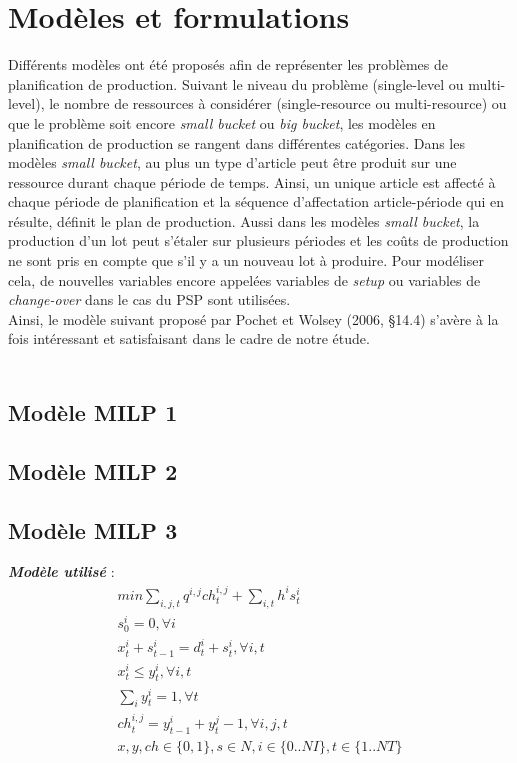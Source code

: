 \documentclass[12pt,a4paper]{article}
\begin{document}
		\section{Modèles et formulations}
		Différents modèles ont été proposés afin de représenter les problèmes de planification de production. Suivant le niveau du problème (single-level ou multi-level), le nombre de ressources à considérer (single-resource ou multi-resource) ou que le problème soit encore \emph{small bucket} ou \emph{big bucket}, les modèles en planification de production se rangent dans différentes catégories.   Dans les modèles \emph{small bucket}, au plus un type d'article  peut être produit sur une ressource durant chaque période de temps. Ainsi, un unique article est affecté à chaque période de planification et la séquence d'affectation article-période qui en résulte, définit le plan de production. Aussi dans les modèles \emph{small bucket}, la production d'un lot peut s'étaler sur plusieurs périodes et les coûts de production ne sont pris en compte que s'il y a un nouveau lot à produire. Pour modéliser cela, de nouvelles variables encore appelées variables de \emph{setup} ou variables de \emph{change-over} dans le cas du PSP sont utilisées. \\
		\hspace*{.5cm} Ainsi, le modèle suivant proposé par Pochet et Wolsey (2006, §14.4) s'avère à la fois intéressant et satisfaisant dans le cadre de notre étude.\\
		\\
		\subsection{Modèle MILP 1}
		\subsection{Modèle MILP 2}
		\subsection{Modèle MILP 3}
		\textbf{\textsl{Modèle utilisé}} :
		\begin{eqnarray}
			min \sum_{i,j,t} q^{i,j}ch_{t}^{i,j} + \sum_{i,t} h^{i} s_{t}^{i} \\
			s_{0}^{i} = 0, \forall i \\
			x_{t}^{i} + s_{t-1}^{i} = d_{t}^{i} + s_{t}^{i}, \forall i,t \\
			x_{t}^{i} \leq y_{t}^{i}, \forall i,t \\
			\sum_{i} y_{t}^{i} = 1 , \forall t \\
			ch_{t}^{i,j} = y_{t-1}^{i} + y_{t}^{j} - 1, \forall i,j,t \\
			x,y,ch \in \{0,1\}, s \in N, i \in \{0..NI\}, t \in \{1..NT\}
		\end{eqnarray}
		
\end{document}
